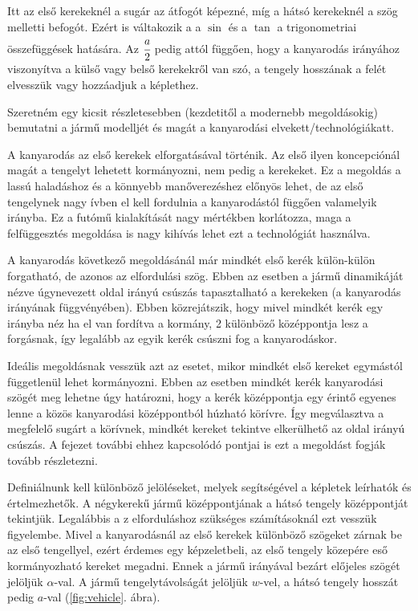 Itt az első kerekeknél a sugár az átfogót képezné, míg a hátsó kerekeknél a szög melletti befogót. Ezért is váltakozik a a $\sin$ és a $\tan$ a trigonometriai összefüggések hatására. Az $\cfrac{a}{2}$ pedig attól függően, hogy a kanyarodás irányához viszonyítva a külső vagy belső kerekekről van szó, a tengely hosszának a felét elvesszük vagy hozzáadjuk a képlethez. 

Szeretném egy kicsit részletesebben (kezdetitől a modernebb megoldásokig) bemutatni a jármű modelljét és magát a kanyarodási elvekett/technológiákatt. 

A kanyarodás az első kerekek elforgatásával történik. Az első ilyen koncepciónál magát a tengelyt lehetett kormányozni, nem pedig a kerekeket. Ez a megoldás a lassú haladáshoz és a könnyebb manőverezéshez előnyös lehet, de az első tengelynek nagy ívben el kell fordulnia a kanyarodástól függően valamelyik irányba. Ez a futómű kialakítását nagy mértékben korlátozza, maga a felfüggesztés megoldása is nagy kihívás lehet ezt a technológiát használva.

A kanyarodás következő megoldásánál már mindkét első kerék külön-külön forgatható, de azonos az elfordulási szög. Ebben az esetben a jármű dinamikáját nézve úgynevezett oldal irányú csúszás tapasztalható a kerekeken (a kanyarodás irányának függvényében). Ebben közrejátszik, hogy mivel mindkét kerék egy irányba néz ha el van fordítva a kormány, 2 különböző középpontja lesz a forgásnak, így legalább az egyik kerék csúszni fog a kanyarodáskor.

Ideális megoldásnak vesszük azt az esetet, mikor mindkét első kereket egymástól függetlenül lehet kormányozni. Ebben az esetben mindkét kerék kanyarodási szögét meg lehetne úgy határozni, hogy a kerék középpontja egy érintő egyenes lenne a közös kanyarodási középpontból húzható körívre. Így megválasztva a megfelelő sugárt a körívnek, mindkét kereket tekintve elkerülhető az oldal irányú csúszás. A fejezet további ehhez kapcsolódó pontjai is ezt a megoldást fogják tovább részletezni.


Definiálnunk kell különböző jelöléseket, melyek segítségével a képletek leírhatók és értelmezhetők. A négykerekű jármű középpontjának a hátsó tengely középpontját tekintjük. Legalábbis a z elforduláshoz szükséges számításoknál ezt vesszük figyelembe. Mivel a kanyarodásnál az első kerekek különböző szögeket zárnak be az első tengellyel, ezért érdemes egy képzeletbeli, az első tengely közepére eső kormányozható kereket megadni. Ennek a jármű irányával bezárt előjeles szögét jelöljük $\alpha$-val. A jármű tengelytávolságát jelöljük $w$-vel, a hátsó tengely hosszát pedig $a$-val (\ref{fig:vehicle}. ábra).

